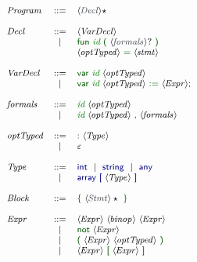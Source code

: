 \begin{figure}[H]
    \hspace*{-1cm}
    \begin{minipage}{0.5\textwidth}
        \[\footnotesize
        \begin{array}[t]{lcl@{\hspace{0.4cm}}}
          \nta{Program} & \Prod & \ntstar{Decl} \\
          \\
          \nta{Decl} & \Prod & \nt{VarDecl}\ \\
                       & \VB & \vterminal{fun}\ \terminal{id}\ \vterminal{(}\ \ntq{formals}\ \vterminal{)}\\
                       &&  \nt{optTyped}\ \vterminal{=}\ \nt{stmt} \\
          \\
          \nta{VarDecl} & \Prod & \vterminal{var}\ \terminal{id}\ \nt{optTyped} \\
                        & \VB   & \vterminal{var}\ \terminal{id}\ \nt{optTyped}\ \vterminal{:=}\ \nt{Expr} \vterminal{;}\\
          \\
          \nta{formals} & \Prod & \terminal{id}\ \nt{optTyped} \\
                        & \VB & \terminal{id}\ \nt{optTyped}\ \vterminal{,}\ \nt{formals}\\
                      \\
          \nta{optTyped} & \Prod & \vterminal{:}\ \nt{Type}\\
                        & \VB{} & \varepsilon \\
          \\
          \nta{Type} & \Prod & \Cty{int}\ \VB\ \Cty{string}\ \VB\ \Cty{any} \\
                     & \VB   & \Cty{array}\ \Cty{[}\ \nt{Type}\ \Cty{]} \\
          \\
          \nta{Block} & \Prod & \vterminal{\{}\ \ntstar{Stmt}\ \vterminal{\}} \\
          \\
          \nta{Expr} & \Prod & \nt{Expr}\ \nt{binop}\ \nt{Expr} \\
                     & \VB   & \vterminal{not}\ \nt{Expr} \\
                     & \VB   & \vterminal{(}\ \nt{Expr}\ \nt{optTyped}\ \vterminal{)} \\
                     & \VB   & \nt{Expr}\ \vterminal{[}\ \nt{Expr}\ \vterminal{]} \\

\end{array}\]
\end{minipage}
\end{figure}
